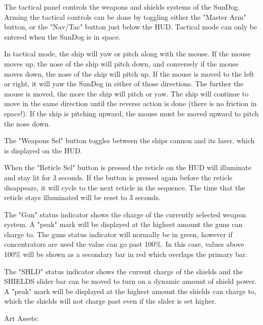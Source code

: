 The tactical panel controls the weapons and shields systems of the SunDog.
Arming the tactical controls can be done by toggling either the "Master Arm"
button, or the "Nav/Tac" button just below the HUD.  Tactical mode can
only be entered when the SunDog is in space.

In tactical mode, the ship will yaw or pitch along with the mouse.  If
the mouse moves up, the nose of the ship will pitch down, and conversely
if the mouse moves down, the nose of the ship will pitch up.  If the
mouse is moved to the left or right, it will yaw the SunDog in either
of those directions.  The further the mouse is moved, the more the ship
will pitch or yaw.  The ship will continue to move in the same direction until
the reverse action is done (there is no friction in space!).  If the
ship is pitching upward, the mouse must be moved upward to pitch the nose
down.

The "Weapons Sel" button toggles between the ships cannon and its laser, 
which is displayed on the HUD.

When the "Reticle Sel" button is pressed the reticle on the HUD will
illuminate and stay lit for 3 seconds.  If the button is pressed again
before the reticle disappears, it will cycle to the next reticle
in the sequence.  The time that the reticle stays illuminated will
be reset to 3 seconds.

The "Gun" status indicator shows the charge of the currently selected
weapon system.  A "peak" mark will be displayed at the highest amount
the guns can charge to.  The guns status indicator will normally be in
green, however if concentrators are used the value can go past 100\%.
In this case, values above 100\% will be shown as a secondary bar in
red which overlaps the primary bar.

The "SHLD" status indicator shows the current charge of the shields and
the SHIELDS slider bar can be moved to turn on a dynamic amount of
shield power.  A "peak" mark will be displayed at the highest amount
the shields can charge to, which the shields will not charge past
even if the slider is set higher.

Art Assets:

